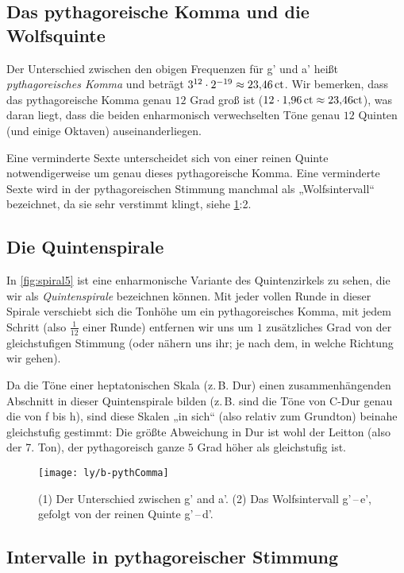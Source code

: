 \subsection{Das pythagoreische Komma und die Wolfsquinte}

Der Unterschied zwischen den obigen Frequenzen für \sharp g' und \flat a' heißt
\emph{pythagoreisches Komma} und beträgt
$3^{12}\cdot 2^{-19}\approx 23{,}46\,\text{ct}$. Wir bemerken, dass das
pythagoreische Komma genau $12$ Grad groß ist
($12\cdot 1{,}96\,\mathrm{ct}\approx 23{,}46\mathrm{ct}$), was daran liegt, dass die
beiden enharmonisch verwechselten Töne genau $12$ Quinten (und einige Oktaven)
auseinanderliegen.

Eine verminderte Sexte unterscheidet sich von einer reinen Quinte
notwendigerweise um genau dieses pythagoreische Komma. Eine verminderte Sexte
wird in der pythagoreischen Stimmung manchmal als „Wolfsintervall“ bezeichnet,
da sie sehr verstimmt klingt, siehe \cref{fig:pythComma}:2.

\subsection{Die Quintenspirale}

In \cref{fig:spiral5} ist eine enharmonische Variante des Quintenzirkels zu
sehen, die wir als \emph{Quintenspirale} bezeichnen können. Mit jeder vollen
Runde in dieser Spirale verschiebt sich die Tonhöhe um ein pythagoreisches
Komma, mit jedem Schritt (also $\frac1{12}$ einer Runde) entfernen wir uns um
$1$ zusätzliches Grad von der gleichstufigen Stimmung (oder nähern uns ihr; je
nach dem, in welche Richtung wir gehen).

Da die Töne einer heptatonischen Skala (z.\,B. Dur) einen zusammenhängenden
Abschnitt in dieser Quintenspirale bilden (z.\,B. sind die Töne von C-Dur genau
die von f bis h), sind diese Skalen „in sich“ (also relativ zum Grundton)
beinahe gleichstufig gestimmt: Die größte Abweichung in Dur ist wohl der Leitton
(also der 7. Ton), der pythagoreisch ganze $5$ Grad höher als gleichstufig ist.

\begin{figure}[h]
  \centering
  \texttt{[image: ly/b-pythComma]}
  \caption{(1) Der Unterschied zwischen \sharp g’ and \flat a’. (2) Das
    Wolfsintervall \sharp g’\,–\,\flat e’, gefolgt von der reinen Quinte \sharp
    g’\,–\,\sharp d’.}\label{fig:pythComma}
\end{figure}

\subsection{Intervalle in pythagoreischer Stimmung}

